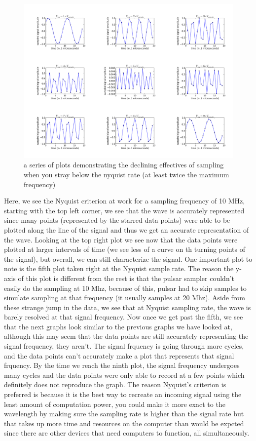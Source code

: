\documentclass[12 pt]{article}
\begin{document}
\begin{figure}[H]
\center
\includegraphics[scale=0.4]{Nyquiststar.png}
\caption{a series of plots demonstrating the declining effectives of
  sampling when you stray below the nyquist rate (at least twice the
  maximum frequency)}
\label{Nyquiststar}
\end{figure}
Here, we see the Nyquist criterion at work for a sampling frequency of
10 MHz, starting with the top left
corner, we see that the wave is accurately represented since many points
(represented by the starred data points) were able to be plotted along
the line of the signal and thus we get an accurate representation of the
wave. Looking at the top right plot we see now that the data points were
plotted at larger intervals of time (we see less of a curve on th
turning points of the signal), but overall, we can still characterize
the signal. One important plot to note is the fifth plot taken right at
the Nyquist sample rate. The reason the y-axis of this plot is different
from the rest is that the pulsar sampler couldn't easily do the sampling
at 10 Mhz, because of this, pulsar had to skip samples to simulate
sampling at that frequency (it usually samples at 20 Mhz). Aside from
these strange jump in the data, we see that at Nyquist sampling rate,
the wave is barely resolved at that signal frequency. Now once we get
past the fifth, we see that the next graphs look similar to the previous
graphs we have looked at, although this may seem that the data points
are still accurately representing the signal frequency, they aren't. The
signal frquency is going through more cycles, and the data points can't
accurately make a plot that represents that signal frquency. By the time
we reach the ninth plot, the signal frequency undergoes many cycles and
the data points were only able to record at a few points which
definitely does not reproduce the graph. The reason Nyquist's criterion
is preferred is because it is the best way to recreate an incoming
signal using the least amount of computation power, you could make it
more exact to the wavelength by making sure the sampling rate is higher
than the signal rate but that takes up more time and resources on the
computer than would be expcted since there are other devices that need
computers to function, all simultaneously.
\end{document}
